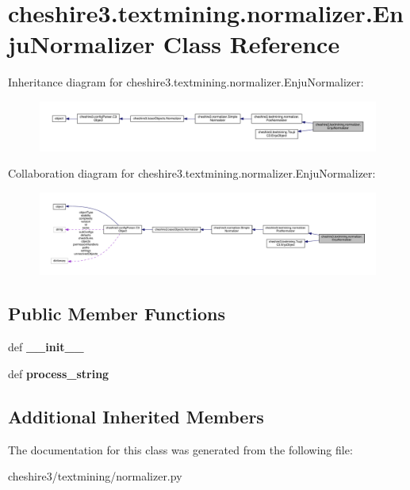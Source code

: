 \hypertarget{classcheshire3_1_1textmining_1_1normalizer_1_1_enju_normalizer}{\section{cheshire3.\-textmining.\-normalizer.\-Enju\-Normalizer Class Reference}
\label{classcheshire3_1_1textmining_1_1normalizer_1_1_enju_normalizer}
}


Inheritance diagram for cheshire3.\-textmining.\-normalizer.\-Enju\-Normalizer\-:
\nopagebreak
\begin{figure}[H]
\begin{center}
\leavevmode
\includegraphics[width=350pt]{classcheshire3_1_1textmining_1_1normalizer_1_1_enju_normalizer__inherit__graph}
\end{center}
\end{figure}


Collaboration diagram for cheshire3.\-textmining.\-normalizer.\-Enju\-Normalizer\-:
\nopagebreak
\begin{figure}[H]
\begin{center}
\leavevmode
\includegraphics[width=350pt]{classcheshire3_1_1textmining_1_1normalizer_1_1_enju_normalizer__coll__graph}
\end{center}
\end{figure}
\subsection*{Public Member Functions}
\begin{DoxyCompactItemize}
\item 
\hypertarget{classcheshire3_1_1textmining_1_1normalizer_1_1_enju_normalizer_a90a19fc296bb7cfdd3308b8198aebd5b}{def {\bfseries \-\_\-\-\_\-init\-\_\-\-\_\-}}\label{classcheshire3_1_1textmining_1_1normalizer_1_1_enju_normalizer_a90a19fc296bb7cfdd3308b8198aebd5b}

\item 
\hypertarget{classcheshire3_1_1textmining_1_1normalizer_1_1_enju_normalizer_a15b60072c7c62617699d1a0f4bcbb995}{def {\bfseries process\-\_\-string}}\label{classcheshire3_1_1textmining_1_1normalizer_1_1_enju_normalizer_a15b60072c7c62617699d1a0f4bcbb995}

\end{DoxyCompactItemize}
\subsection*{Additional Inherited Members}


The documentation for this class was generated from the following file\-:\begin{DoxyCompactItemize}
\item 
cheshire3/textmining/normalizer.\-py\end{DoxyCompactItemize}
